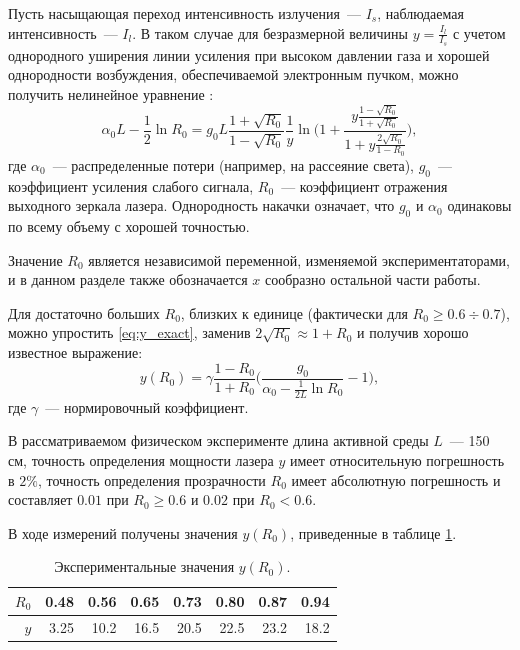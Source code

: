 \documentclass[tikz,10pt,a4paper]{article}
\begin{document}
Пусть насыщающая переход интенсивность излучения~--- $I_s$, наблюдаемая интенсивность~---
$I_l$. В таком случае для безразмерной величины $y = \frac{I_l}{I_s}$ с учетом однородного
уширения линии усиления при высоком давлении газа и хорошей однородности возбуждения,
обеспечиваемой электронным пучком, можно получить нелинейное уравнение \cite{champagne1982transient}:
\begin{equation}
  \alpha_0 L - \frac{1}{2} \ln R_0 = g_0 L \frac{1 + \sqrt{R_0}}{1 - \sqrt{R_0}} \frac{1}{y} \ln \Big( 1 + \frac{y \frac{1 - \sqrt{R_0}}{1 + \sqrt{R_0}}}{1 + y \frac{2 \sqrt{R_0}}{1 - R_0}} \Big),
  \label{eq:y_exact}
\end{equation}
где $\alpha_0$~--- распределенные потери (например, на рассеяние света),
$g_0$~--- коэффициент усиления слабого сигнала, $R_0$~--- коэффициент отражения выходного
зеркала лазера. Однородность накачки означает, что $g_0$ и $\alpha_0$ одинаковы по
всему объему с хорошей точностью.

Значение $R_0$ является независимой переменной, изменяемой экспериментаторами, и в данном
разделе также обозначается $x$ сообразно остальной части работы.

Для достаточно больших $R_0$, близких к единице (фактически для $R_0 \geq 0.6 \div 0.7$),
можно упростить \eqref{eq:y_exact}, заменив $2 \sqrt{R_0} \approx 1 + R_0$ и получив
хорошо известное выражение\cite{champagne1982transient}:
\begin{equation}
  y(R_0) = \gamma \frac{1 - R_0}{1 + R_0} \Big(\frac{g_0}{\alpha_0 - \frac{1}{2L} \ln R_0} - 1\Big),
  \label{eq:y_approx}
\end{equation}
где $\gamma$~--- нормировочный коэффициент.

В рассматриваемом физическом эксперименте длина активной среды $L$~--- 150 см,
точность определения мощности лазера $y$ имеет
относительную погрешность в $2\%$, точность определения прозрачности $R_0$ имеет
абсолютную погрешность и составляет $0.01$ при $R_0 \geq 0.6$ и $0.02$ при $R_0 < 0.6$.

В ходе измерений получены значения $y(R_0)$, приведенные в таблице \ref{tabl:measurements}.

\begin{table}[h]
  \caption{Экспериментальные значения $y(R_0)$.}
  \centering
  \begin{tabular}{| r | r | r | r | r | r | r | r |}
	\hline
	$R_0$	&	0.48	&	0.56	&	0.65	&	0.73	&	0.80	&	0.87	&	0.94	\\ \hline
	$y$		&	3.25	&	10.2	&	16.5	&	20.5	&	22.5	&	23.2	&	18.2	\\ \hline
  \end{tabular}
  \label{tabl:measurements}
\end{table}
\end{document}
